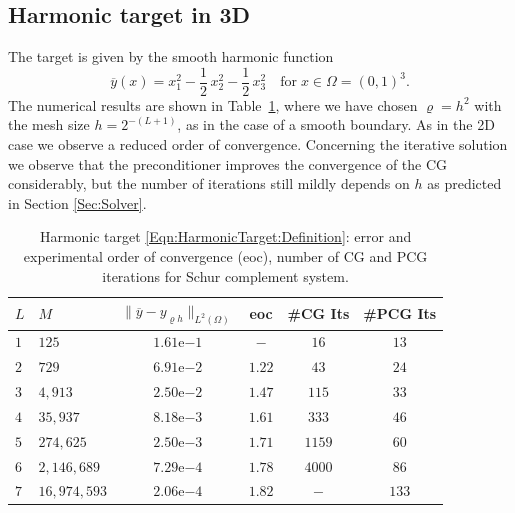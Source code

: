 \documentclass{article}
\numberwithin{equation}{section}
\begin{document}
\subsection{Harmonic target in 3D}
\label{Subsec:NumericalResults:HarmonicTarget}
The target is given by the smooth harmonic function
\begin{equation}
  \label{Eqn:HarmonicTarget:Definition}
  \overline{y}(x) = x_1^2- \frac{1}{2} \, x_2^2 - \frac{1}{2} \, x_3^2
  \quad \mbox{for} \; x \in \Omega = (0,1)^3.
\end{equation}
The numerical results are shown in
Table~\ref{tab:solver_dirichlet_bnd_harmonic_target}, where we have chosen
$\varrho = h^2$ with the mesh size $h=2^{-(L+1)}$,
as in the case of a smooth boundary. As in the 2D case
we observe a reduced order of convergence. Concerning the iterative
solution we observe that the preconditioner improves the convergence of
the CG considerably, but the number of iterations still mildly depends on
$h$ as predicted in Section \ref{Sec:Solver}.

\begin{table}[ht]
  {\small
      \begin{center}
    \begin{tabular}{llcccc}
      \hline
      $L$ & $M$ & $\|\overline{y} - y_{\varrho h}\|_{L^2(\Omega)}$
      & eoc & \#CG Its & \#PCG Its\\
      \hline
      $1$&$125$&$1.61$e$-1$& $-$  &$16$  & $13$\\
      $2$&$729$&$6.91$e$-2$& $1.22$  &$43$  & $24$\\
      $3$&$4,913$&$2.50$e$-2$& $1.47$ & $115$ & $33$\\
      $4$&$35,937$&$8.18$e$-3$& $1.61$ & $333$ &$46$ \\
      $5$&$274,625$&$2.50$e$-3$&$1.71$ &$1159$ &$60$ \\
      $6$&$2,146,689$&$7.29$e$-4$&$1.78$ & $4000$ &$86$\\
      $7$&$16,974,593$&$2.06$e$-4$&$1.82$ & $-$ &$133$\\
      \hline
    \end{tabular}
    \end{center}
    \caption{Harmonic target \eqref{Eqn:HarmonicTarget:Definition}:
    error and experimental order of convergence (eoc), number
    of CG and PCG iterations for Schur complement system.} 
    \label{tab:solver_dirichlet_bnd_harmonic_target}
  }
\end{table}
\end{document}
